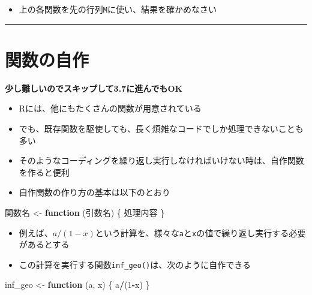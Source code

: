 \documentclass[
]{book}
\newenvironment{Shaded}{\begin{snugshade}}{\end{snugshade}}
\newcommand{\ControlFlowTok}[1]{\textcolor[rgb]{0.13,0.29,0.53}{\textbf{#1}}}
\newcommand{\DecValTok}[1]{\textcolor[rgb]{0.00,0.00,0.81}{#1}}
\newcommand{\NormalTok}[1]{#1}
\newcommand{\OtherTok}[1]{\textcolor[rgb]{0.56,0.35,0.01}{#1}}
\newcommand{\SpecialCharTok}[1]{\textcolor[rgb]{0.81,0.36,0.00}{\textbf{#1}}}
\providecommand{\tightlist}{%
  \setlength{\itemsep}{0pt}\setlength{\parskip}{0pt}}
\begin{document}
\begin{itemize}
\tightlist
\item
  上の各関数を先の行列\texttt{M}に使い、結果を確かめなさい
\end{itemize}

\begin{center}\rule{0.5\linewidth}{0.5pt}\end{center}

\hypertarget{ux95a2ux6570ux306eux81eaux4f5c}{%
\section{関数の自作}\label{ux95a2ux6570ux306eux81eaux4f5c}}

\textbf{少し難しいのでスキップして3.7に進んでもOK }

\begin{itemize}
\tightlist
\item
  Rには、他にもたくさんの関数が用意されている
\item
  でも、既存関数を駆使しても、長く煩雑なコードでしか処理できないことも多い
\item
  そのようなコーディングを繰り返し実行しなければいけない時は、自作関数を作ると便利
\item
  自作関数の作り方の基本は以下のとおり
\end{itemize}

\begin{Shaded}
\begin{Highlighting}[]
\NormalTok{関数名 }\OtherTok{\textless{}{-}} \ControlFlowTok{function}\NormalTok{ (引数名) \{}
\NormalTok{  処理内容}
\NormalTok{\}}
\end{Highlighting}
\end{Shaded}

\begin{itemize}
\tightlist
\item
  例えば、\(a/(1-x)\)という計算を、様々な\texttt{a}と\texttt{x}の値で繰り返し実行する必要があるとする
\item
  この計算を実行する関数\texttt{inf\_geo()}は、次のように自作できる
\end{itemize}

\begin{Shaded}
\begin{Highlighting}[]
\NormalTok{inf\_geo }\OtherTok{\textless{}{-}} \ControlFlowTok{function}\NormalTok{ (a, x) \{}
\NormalTok{  a}\SpecialCharTok{/}\NormalTok{(}\DecValTok{1}\SpecialCharTok{{-}}\NormalTok{x)}
\NormalTok{\}}
\end{Highlighting}
\end{Shaded}
\end{document}
